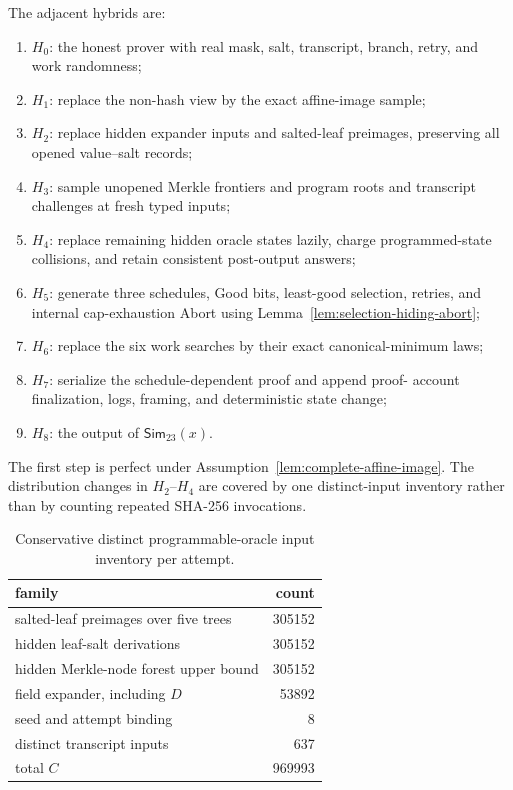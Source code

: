The adjacent hybrids are:
\begin{enumerate}
  \item \(H_0\): the honest prover with real mask, salt, transcript, branch,
        retry, and work randomness;
  \item \(H_1\): replace the non-hash view by the exact affine-image sample;
  \item \(H_2\): replace hidden expander inputs and salted-leaf preimages,
        preserving all opened value--salt records;
  \item \(H_3\): sample unopened Merkle frontiers and program roots and
        transcript challenges at fresh typed inputs;
  \item \(H_4\): replace remaining hidden oracle states lazily, charge
        programmed-state collisions, and retain consistent post-output
        answers;
  \item \(H_5\): generate three schedules, Good bits, least-good selection,
        retries, and internal cap-exhaustion Abort using
        Lemma~\ref{lem:selection-hiding-abort};
  \item \(H_6\): replace the six work searches by their exact
        canonical-minimum laws;
  \item \(H_7\): serialize the schedule-dependent proof and append proof-
        account finalization, logs, framing, and deterministic state change;
  \item \(H_8\): the output of \(\mathsf{Sim}_{23}(x)\).
\end{enumerate}
The first step is perfect under
Assumption~\ref{lem:complete-affine-image}.  The
distribution changes in \(H_2\)--\(H_4\) are covered by one distinct-input
inventory rather than by counting repeated SHA-256 invocations.

\begin{table}[t]
\centering
\caption{Conservative distinct programmable-oracle input inventory per
attempt.}
\label{tab:epro-inventory}
\begin{tabular}{@{}lr@{}}
\toprule
family & count \\
\midrule
salted-leaf preimages over five trees & 305152 \\
hidden leaf-salt derivations & 305152 \\
hidden Merkle-node forest upper bound & 305152 \\
field expander, including \(D\) & 53892 \\
seed and attempt binding & 8 \\
distinct transcript inputs & 637 \\
\midrule
total \(C\) & 969993 \\
\bottomrule
\end{tabular}
\end{table}

